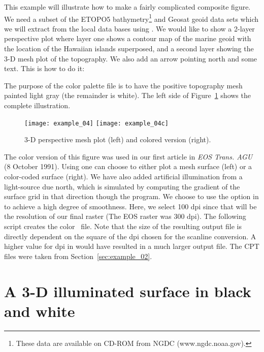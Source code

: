 This example will illustrate how to make a fairly complicated
composite figure.  We need a subset of the ETOPO5 bathymetry\footnote{
These data are available on CD-ROM from NGDC (www.ngdc.noaa.gov).}
and Geosat geoid data sets which we will extract from the local
data bases using .  We would like to show a
2-layer perspective plot where layer one shows a contour map
of the marine geoid with the location of the Hawaiian islands
superposed, and a second layer showing the 3-D mesh plot of
the topography.  We also add an arrow pointing north and some
text.  This is how to do it:


The purpose of the color palette file  is to have
the positive topography mesh painted light gray (the remainder
is white). The left side of Figure~\ref{fig:GMT_example_04} shows the complete illustration.

\begin{figure}[ht]
   \texttt{[image: example\_04]}\hfill
   \texttt{[image: example\_04c]}
   \caption{3-D perspective mesh plot (left) and colored version (right).}
   \label{fig:GMT_example_04}
\end{figure}

The color version of this figure was used in our first article in \emph{EOS
Trans. AGU} (8 October 1991).  Using  one can choose
to either plot a mesh surface (left) or a color-coded surface (right).
We have also added artificial illumination from a light-source due north,
which is simulated by computing the gradient of the surface grid
in that direction though the  program.
We choose to use the  option in  to
achieve a high degree of smoothness.  Here, we select 100 dpi
since that will be the resolution of our final raster
(The EOS raster was 300 dpi).
The following script creates
the color \PS\ file.  Note that the size of the
resulting output file is directly dependent on the square of
the dpi chosen for the scanline conversion.  A higher value
for dpi in  would have resulted in a much larger
output file.  The CPT files were taken from Section~\ref{sec:example_02}.



\section{A 3-D illuminated surface in black and white}

